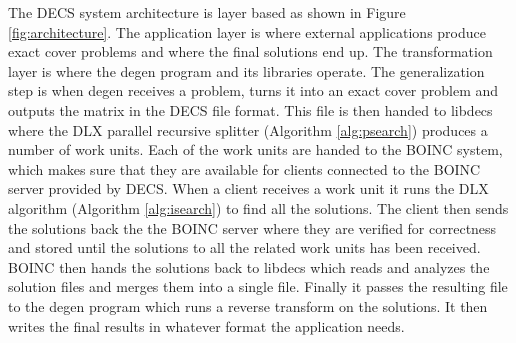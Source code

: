 The DECS system architecture is layer based as shown in Figure \ref{fig:architecture}.
The application layer is where external applications produce exact cover problems and where the final solutions end up.
The transformation layer is where the degen program and its libraries operate.
The generalization step is when degen receives a problem, turns it into an exact cover problem and outputs the matrix in the DECS file format.
This file is then handed to libdecs where the DLX parallel recursive splitter (Algorithm \ref{alg:psearch}) produces a number of work units.
Each of the work units are handed to the BOINC system, which makes sure that they are available for clients connected to the BOINC server provided by DECS.
When a client receives a work unit it runs the DLX algorithm (Algorithm \ref{alg:isearch}) to find all the solutions.
The client then sends the solutions back the the BOINC server where they are verified for correctness and stored until the solutions to all the related work units has been received.
BOINC then hands the solutions back to libdecs which reads and analyzes the solution files and merges them into a single file.
Finally it passes the resulting file to the degen program which runs a reverse transform on the solutions.
It then writes the final results in whatever format the application needs.









